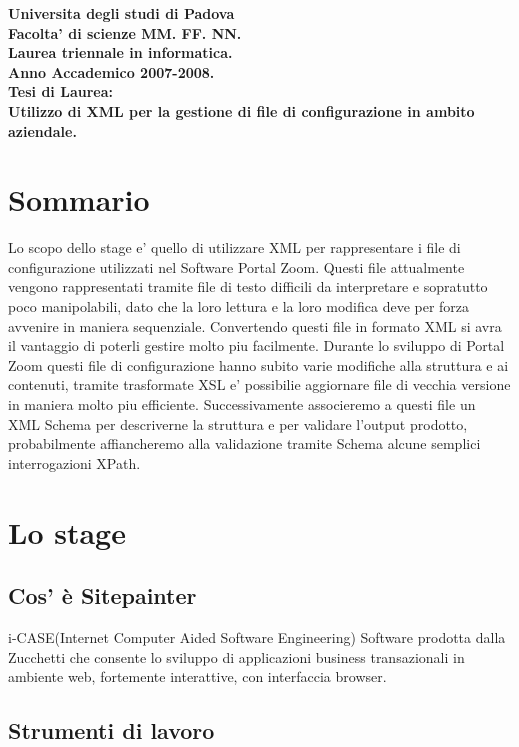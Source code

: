 \documentclass[11pt,titlepage,a4paper,twoside,openany]{book}
\begin{document}
\begin{titlepage}
\begin{center}
\textbf{
\Huge Universita degli studi di Padova\\
\Large Facolta' di scienze MM. FF. NN.\\ 
Laurea triennale in informatica.\\
 Anno Accademico 2007-2008. \\
\Large Tesi di Laurea:\\ 
Utilizzo di XML per la gestione di file di configurazione in ambito aziendale.}
\end{center}

\end{titlepage}
\tableofcontents
\chapter{Sommario}
Lo scopo dello stage e' quello di utilizzare XML per rappresentare i file di configurazione utilizzati nel Software Portal Zoom.
Questi file attualmente vengono rappresentati tramite file di testo difficili da interpretare e sopratutto poco manipolabili, dato che la loro lettura e la loro modifica deve per forza avvenire in maniera sequenziale.
Convertendo questi file in formato XML si avra il vantaggio di poterli gestire molto piu facilmente.
Durante lo sviluppo di Portal Zoom questi file di configurazione hanno subito varie modifiche alla struttura e ai contenuti, tramite trasformate XSL e' possibilie aggiornare file di vecchia versione in maniera molto piu efficiente.
Successivamente associeremo a questi file un XML Schema per descriverne la struttura e per validare l'output prodotto, probabilmente affiancheremo alla validazione tramite Schema alcune semplici interrogazioni XPath.

\chapter{Lo stage}

\section{Cos' \`e Sitepainter}
i-CASE(Internet Computer Aided Software Engineering) Software prodotta dalla Zucchetti che consente lo sviluppo di applicazioni business transazionali in ambiente web, fortemente interattive, con interfaccia browser.

\section{Strumenti di lavoro}
\end{document}
